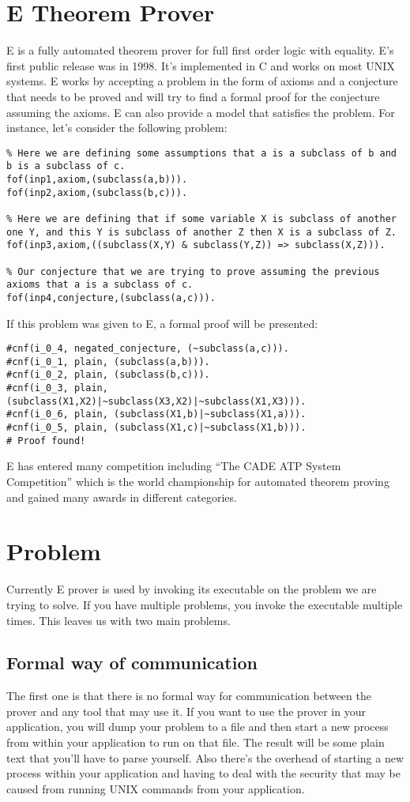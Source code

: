 \section{E Theorem Prover}
E is a fully automated theorem prover for full first order logic with equality. E's first public release was in 1998. It's implemented in C and works on most UNIX systems. E works by accepting a problem in the form of axioms and a conjecture that needs to be proved and will try to find a formal proof for the conjecture assuming the axioms. E can also provide a model that satisfies the problem. For instance, let's consider the following problem:
\begin{lstlisting}
% Here we are defining some assumptions that a is a subclass of b and b is a subclass of c.
fof(inp1,axiom,(subclass(a,b))).
fof(inp2,axiom,(subclass(b,c))).

% Here we are defining that if some variable X is subclass of another one Y, and this Y is subclass of another Z then X is a subclass of Z.
fof(inp3,axiom,((subclass(X,Y) & subclass(Y,Z)) => subclass(X,Z))).

% Our conjecture that we are trying to prove assuming the previous axioms that a is a subclass of c.
fof(inp4,conjecture,(subclass(a,c))).
\end{lstlisting}
If this problem was given to E, a formal proof will be presented:
\begin{lstlisting}
#cnf(i_0_4, negated_conjecture, (~subclass(a,c))).
#cnf(i_0_1, plain, (subclass(a,b))).
#cnf(i_0_2, plain, (subclass(b,c))).
#cnf(i_0_3, plain, (subclass(X1,X2)|~subclass(X3,X2)|~subclass(X1,X3))).
#cnf(i_0_6, plain, (subclass(X1,b)|~subclass(X1,a))).
#cnf(i_0_5, plain, (subclass(X1,c)|~subclass(X1,b))).
# Proof found!
\end{lstlisting}
E has entered many competition including ``The CADE ATP System Competition'' which is the world championship for automated theorem proving and gained many awards in different categories.

\section{Problem}
Currently E prover is used by invoking its executable on the problem we are trying to solve. If you have multiple problems, you invoke the executable multiple times. This leaves us with two main problems.

\subsection{Formal way of communication}
The first one is that there is no formal way for communication between the prover and any tool that may use it. If you want to use the prover in your application, you will dump your problem to a file and then start a new process from within your application to run on that file. The result will be some plain text that you'll have to parse yourself. Also there's the overhead of starting a new process within your application and having to deal with the security that may be caused from running UNIX commands from your application.

